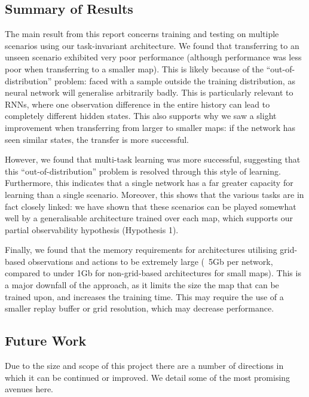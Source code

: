 \subsection{Summary of Results}

The main result from this report concerns training and testing on multiple scenarios using our task-invariant architecture. We found that transferring to an unseen scenario exhibited very poor performance (although performance was less poor when transferring to a smaller map). This is likely because of the ``out-of-distribution'' \cite{ood} problem: faced with a sample outside the training distribution, as neural network will generalise arbitrarily badly. This is particularly relevant to RNNs, where one observation difference in the entire history can lead to completely different hidden states. This also supports why we saw a slight improvement when transferring from larger to smaller maps: if the network has seen similar states, the transfer is more successful.



However, we found that multi-task learning was more successful, suggesting that this ``out-of-distribution'' problem is resolved through this style of learning. Furthermore, this indicates that a single network has a far greater capacity for learning than a single scenario. Moreover, this shows that the various tasks are in fact closely linked: we have shown that these scenarios can be played somewhat well by a generalisable architecture trained over each map, which supports our partial observability hypothesis (Hypothesis 1).



Finally, we found that the memory requirements for architectures utilising grid-based observations and actions to be extremely large (~5Gb per network, compared to under 1Gb for non-grid-based architectures for small maps). This is a major downfall of the approach, as it limits the size the map that can be trained upon, and increases the training time. This may require the use of a smaller replay buffer or grid resolution, which may decrease performance.





\subsection{Future Work}

Due to the size and scope of this project there are a number of directions in which it can be continued or improved. We detail some of the most promising avenues here.


